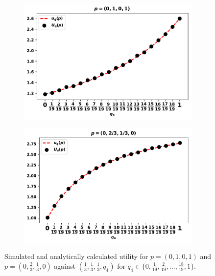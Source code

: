 \documentclass[10pt]{article}
\begin{document}
\begin{figure}[!htbp]
    \begin{center}
        \begin{subfigure}{0.45\textwidth}
            \includegraphics[width=\linewidth]{img/validation_against_player_one.pdf}
        \end{subfigure}
        \begin{subfigure}{0.45\textwidth}
            \includegraphics[width=\linewidth]{img/validation_against_player_two.pdf}
        \end{subfigure}
    \end{center}
    \caption{Simulated and analytically calculated utility for \(p = (0, 1, 0, 1)\)
    and \(p = (0, \frac{2}{3}, \frac{1}{3}, 0)\) against \((\frac{1}{3}, \frac{1}{3}, \frac{1}{3}, q_4)\) for
    \(q_4 \in \{0,  \frac{1}{19}, \frac{2}{19}, \dots, \frac{18}{19}, 1\}\).}
    \label{fig:analytical_simulated}
\end{figure}
\end{document}
